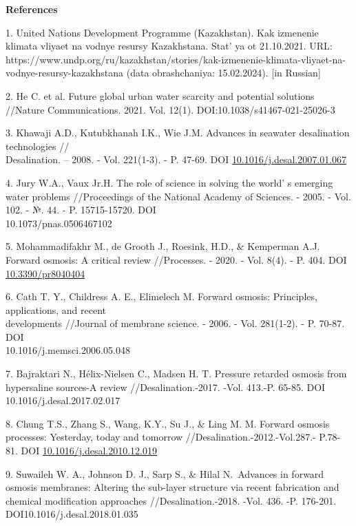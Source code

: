 \begin{center}
{\bfseries References}
\end{center}

\begin{references}
1. United Nations Development Programme (Kazakhstan). Kak izmenenie
klimata vliyaet na vodnye resursy Kazakhstana. Stat' ya
ot 21.10.2021. URL:
https://www.undp.org/ru/kazakhstan/stories/kak-izmenenie-klimata-vliyaet-na-vodnye-resursy-kazakhstana
(data obrashchaniya: 15.02.2024). {[}in Russian{]}

2. He C. et al. Future global urban water scarcity and potential
solutions //Nature Communications. 2021. Vol. 12(1).
DOI:10.1038/s41467-021-25026-3

3. Khawaji A.D., Kutubkhanah I.K., Wie J.M. Advances in seawater
desalination technologies // \\Desalination. -- 2008. - Vol. 221(1-3). -
P. 47-69. DOI
\href{http://dx.doi.org/10.1016/j.desal.2007.01.067}{10.1016/j.desal.2007.01.067}

4. Jury W.A., Vaux Jr.H. The role of science in solving the
world' s emerging water problems //Proceedings of the
National Academy of Sciences. - 2005. - Vol. 102. - №. 44. - P.
15715-15720. DOI \\10.1073/pnas.0506467102

5. Mohammadifakhr M., de Grooth J., Roesink, H.D., \& Kemperman A.J.
Forward osmosis: A critical review //Processes. - 2020. - Vol. 8(4). -
P. 404. DOI
\href{http://dx.doi.org/10.3390/pr8040404}{10.3390/pr8040404}

6. Cath T. Y., Childress A. E., Elimelech M. Forward osmosis: Principles,
applications, and recent \\developments //Journal of membrane science. -
2006. - Vol. 281(1-2). - P. 70-87. DOI \\10.1016/j.memsci.2006.05.048

7. Bajraktari N., Hélix-Nielsen C., Madsen H. T. Pressure retarded osmosis
from hypersaline sources-A review //Desalination.-2017. -Vol. 413.-P.
65-85. DOI 10.1016/j.desal.2017.02.017

8. Chung T.S., Zhang S., Wang, K.Y., Su J., \& Ling M. M. Forward osmosis
processes: Yesterday, today and tomorrow
//Desalination.-2012.-Vol.287.- P.78-81.
DOI \href{http://dx.doi.org/10.1016/j.desal.2010.12.019}{10.1016/j.desal.2010.12.019}

9. Suwaileh W. A., Johnson D. J., Sarp S., \& Hilal N.~Advances in
forward osmosis membranes: Altering the sub-layer structure via recent
fabrication and chemical modification approaches //Desalination.-2018.
-Vol. 436. -P. 176-201. DOI10.1016/j.desal.2018.01.035


\end{references}
